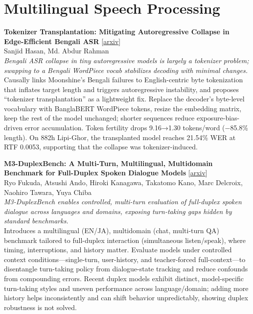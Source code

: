 \documentclass[12pt,letterpaper]{article}
\begin{document}
\medskip


\section*{Multilingual Speech Processing}

{\small\textbf{Tokenizer Transplantation: Mitigating Autoregressive Collapse in Edge-Efficient Bengali ASR}} {\scriptsize[\href{https://arxiv.org/abs/2607.09598}{arxiv}]}\\
{\scriptsize Sanjid Hasan, Md. Abdur Rahman}\\

{\small\textit{Bengali ASR collapse in tiny autoregressive models is largely a tokenizer problem; swapping to a Bengali WordPiece vocab stabilizes decoding with minimal changes.}}\\[1pt]
{\footnotesize Causally links Moonshine's Bengali failures to English-centric byte tokenization that inflates target length and triggers autoregressive instability, and proposes ``tokenizer transplantation'' as a lightweight fix. Replace the decoder's byte-level vocabulary with BanglaBERT WordPiece tokens, resize the embedding matrix, keep the rest of the model unchanged; shorter sequences reduce exposure-bias-driven error accumulation. Token fertility drops 9.16→1.30 tokens/word (−85.8\% length). On 882h Lipi-Ghor, the transplanted model reaches 21.54\% WER at RTF 0.0053, supporting that the collapse was tokenizer-induced.}

\medskip

{\small\textbf{M3-DuplexBench: A Multi-Turn, Multilingual, Multidomain Benchmark for Full-Duplex Spoken Dialogue Models}} {\scriptsize[\href{https://arxiv.org/abs/2607.29125}{arxiv}]}\\
{\scriptsize Ryo Fukuda, Atsushi Ando, Hiroki Kanagawa, Takatomo Kano, Marc Delcroix, Naohiro Tawara, Yuya Chiba}\\

{\small\textit{M3-DuplexBench enables controlled, multi-turn evaluation of full-duplex spoken dialogue across languages and domains, exposing turn-taking gaps hidden by standard benchmarks.}}\\[1pt]
{\footnotesize Introduces a multilingual (EN/JA), multidomain (chat, multi-turn QA) benchmark tailored to full-duplex interaction (simultaneous listen/speak), where timing, interruptions, and history matter. Evaluate models under controlled context conditions---single-turn, user-history, and teacher-forced full-context---to disentangle turn-taking policy from dialogue-state tracking and reduce confounds from compounding errors. Recent duplex models exhibit distinct, model-specific turn-taking styles and uneven performance across language/domain; adding more history helps inconsistently and can shift behavior unpredictably, showing duplex robustness is not solved.}
\end{document}
